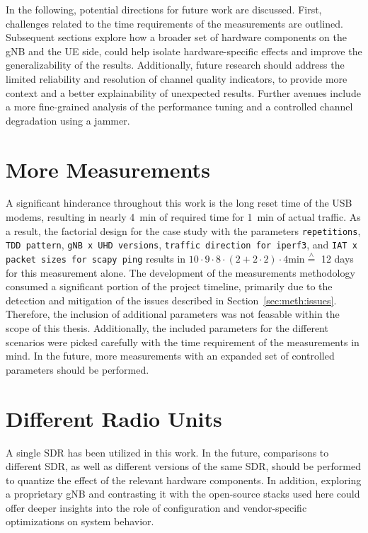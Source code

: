 In the following, potential directions for future work are discussed.
First, challenges related to the time requirements of the measurements are outlined.
Subsequent sections explore how a broader set of hardware components on the \gls{gNB} and the \gls{UE} side,
could help isolate hardware-specific effects and improve the generalizability of the results.
Additionally, future research should address the limited reliability and resolution of channel quality indicators,
to provide more context and a better explainability of unexpected results.
Further avenues include a more fine-grained analysis of the performance tuning and a controlled channel degradation using a jammer.



\section{More Measurements}\label{sec:future:moremsm}
A significant hinderance throughout this work is the long reset time of the USB modems, resulting in nearly
\SI{4}{\minute} of required time for \SI{1}{\minute} of actual traffic.
As a result, the factorial design for the case study with the parameters \texttt{repetitions},
\texttt{\gls{TDD} pattern},
\texttt{\gls{gNB} x \gls{UHD} versions}, \texttt{traffic direction for iperf3}, and
\texttt{\gls{IAT} x packet sizes for scapy ping} results in
$ 10 \cdot 9 \cdot 8 \cdot (2 + 2\cdot2) \cdot 4\text{min} \overset{\scriptscriptstyle\wedge}{=}$ 12 days for
this measurement alone.
The development of the measurements methodology consumed a significant portion of the project timeline,
primarily due to the detection and mitigation of the issues described in Section~\ref{sec:meth:issues}.
Therefore, the inclusion of additional parameters was not feasable within the scope of this thesis.
Additionally, the included parameters for the different scenarios were picked carefully with the time requirement of
the measurements in mind.
In the future, more measurements with an expanded set of controlled parameters should be performed.


\section{Different Radio Units}\label{sec:future:modem}
A single \gls{SDR} has been utilized in this work.
In the future, comparisons to different \gls{SDR}, as well as different versions of the same \gls{SDR},
should be performed to quantize the effect of the relevant hardware components.
In addition, exploring a proprietary \gls{gNB} and contrasting it with the open-source stacks used here could offer
deeper insights into the role of configuration and vendor-specific optimizations on system behavior.


